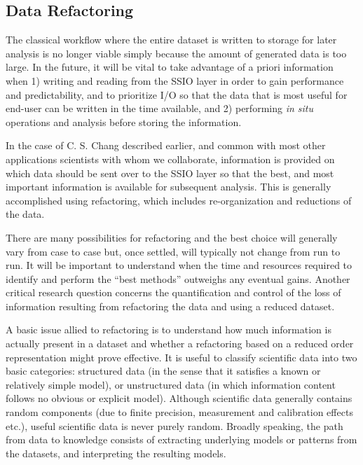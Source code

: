 \subsection{Data Refactoring} \label{sec:data-refactor} 

The classical workflow where the entire dataset is written to storage for
later analysis is no longer viable simply because the amount of generated data is too large.
In the future, it will be vital to take advantage of a priori
information when 1) writing and reading from the SSIO layer in order to gain
performance and predictability, and to prioritize I/O so that the data that
is most useful for end-user can be written in the time available, and 2)
performing {\em in situ} operations and analysis before storing the information.

In the case of C. S. Chang described earlier, and common with most other
applications scientists with whom we collaborate, information is provided on
which data should be sent over to the SSIO layer so that the best, and most
important information is available for subsequent analysis.
This is generally accomplished using refactoring, which includes re-organization and reductions of the data.

There are many possibilities for refactoring and the best choice will generally
vary from case to case but, once settled, will typically not change from run to run. It
will be important to understand when the time and resources required to
identify and perform the ``best methods'' outweighs any eventual gains. Another
critical research question concerns the quantification and control of the loss
of information resulting from refactoring the data and using a reduced dataset. 

A basic issue allied to refactoring is to understand how much information is
actually present in a dataset and whether a refactoring based on a reduced
order representation might prove effective. It is useful to classify scientific
data into two basic categories: structured data (in the sense that it satisfies
a known or relatively simple model), or unstructured data (in which information
content follows no obvious or explicit model).  Although scientific data
generally contains random components (due to finite precision, measurement and
calibration effects etc.), useful scientific data is never purely random.
Broadly speaking, the path from data to knowledge consists of extracting
underlying models or patterns from the datasets, and interpreting the resulting
models. 

